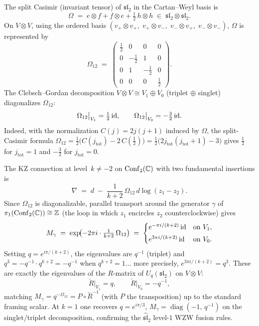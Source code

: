 \begin{computation}
\label{comp:sl2-casimir-spectrum}
The split Casimir (invariant tensor) of $\mathfrak{sl}_2$ in the
Cartan--Weyl basis is
\[
 \Omega \;=\; e\otimes f + f\otimes e + \tfrac{1}{2}\,h\otimes h
 \;\in\; \mathfrak{sl}_2\otimes\mathfrak{sl}_2.
\]
On $V\otimes V$, using the ordered basis
$(v_+\!\otimes\!v_+,\;v_+\!\otimes\!v_-,\;v_-\!\otimes\!v_+,\;v_-\!\otimes\!v_-)$,
$\Omega$ is represented by
\[
 \Omega_{12} \;=\;
 \begin{pmatrix}
 \frac{1}{2} & 0 & 0 & 0 \\[3pt]
 0 & -\frac{1}{2} & 1 & 0 \\[3pt]
 0 & 1 & -\frac{1}{2} & 0 \\[3pt]
 0 & 0 & 0 & \frac{1}{2}
 \end{pmatrix}.
\]
The Clebsch--Gordan decomposition $V\otimes V\cong V_1\oplus V_0$ (triplet $\oplus$ singlet)
diagonalizes $\Omega_{12}$:
\[
 \Omega_{12}\big|_{V_1}=\tfrac{1}{2}\,\mathrm{id},
 \qquad
 \Omega_{12}\big|_{V_0}=-\tfrac{3}{2}\,\mathrm{id}.
\]
Indeed, with the normalization $C(j)=2j(j+1)$ induced by $\Omega$, the split-Casimir formula $\Omega_{12}=\frac{1}{2}\bigl(C(j_{\mathrm{tot}})-2\,C(\tfrac{1}{2})\bigr)=\frac{1}{2}\bigl(2j_{\mathrm{tot}}(j_{\mathrm{tot}}+1)-3\bigr)$
gives $\frac{1}{2}$ for $j_{\mathrm{tot}}=1$ and $-\frac{3}{2}$ for $j_{\mathrm{tot}}=0$.
\end{computation}

\begin{computation}
\label{comp:kz-monodromy-conf2}
The KZ connection at level~$k\neq -2$ on
$\mathrm{Conf}_2(\mathbb C)$ with two fundamental insertions is
\[
 \nabla \;=\; d \;-\; \frac{1}{k+2}\,\Omega_{12}\,d\log(z_1-z_2).
\]
Since $\Omega_{12}$ is diagonalizable, parallel transport around
the generator $\gamma$ of $\pi_1(\mathrm{Conf}_2(\mathbb C))\cong\mathbb Z$
(the loop in which $z_1$ encircles $z_2$ counterclockwise) gives
\begin{equation}\label{eq:conf2-monodromy}
 M_\gamma
 \;=\;
 \exp\!\bigl(-2\pi i\cdot\tfrac{1}{k+2}\,\Omega_{12}\bigr)
 \;=\;
 \begin{cases}
 e^{-\pi i/(k+2)}\,\mathrm{id} & \text{on } V_1, \\[3pt]
 e^{3\pi i/(k+2)}\,\mathrm{id} & \text{on } V_0.
 \end{cases}
\end{equation}
Setting $q=e^{i\pi/(k+2)}$, the eigenvalues are $q^{-1}$ (triplet) and $q^3=-q^{-1}\cdot q^{k+2}=-q^{-1}$
when $q^{k+2}=1$... more precisely, $e^{3\pi i/(k+2)}=q^3$.
These are exactly the eigenvalues of the $R$-matrix of $U_q(\mathfrak{sl}_2)$
on $V\otimes V$:
\[
 \check{R}\big|_{V_1}=q,\qquad \check{R}\big|_{V_0}=-q^{-1},
\]
matching $M_\gamma = q^{-\Omega_{12}} = P\circ \check{R}^{-1}$
(with $P$ the transposition) up to the standard framing scalar.
At $k=1$ one recovers $q=e^{i\pi/3}$, $M_\gamma=\operatorname{diag}(-1,\,q^{-1})$
on the singlet/triplet decomposition, confirming the
$\widehat{\mathfrak{sl}}_2$ level-$1$ WZW fusion rules.
\end{computation}


